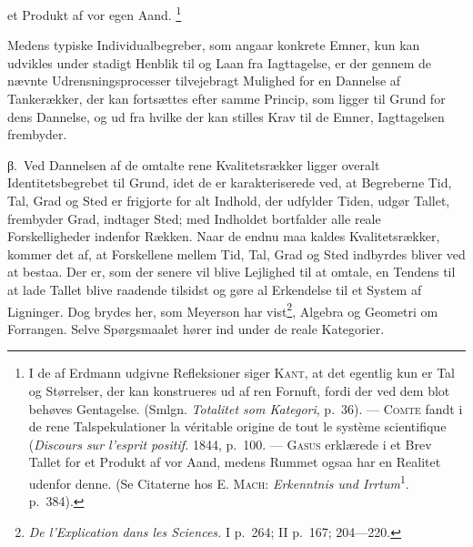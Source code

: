 \documentclass[12pt]{article}
\newcommand{\opage}[1]{\marginnote{\footnotesize\textit{[#1]}}}
\begin{document}
et Produkt af vor egen Aand.%
\footnote{I de af Erdmann udgivne \guillemotright
Refleksioner\guillemotleft{} siger \textsc{Kant}, at det egentlig kun er
Tal og Størrelser, der kan konstrueres ud af ren Fornuft, fordi der ved
dem blot behøves Gentagelse. (Smlgn. \textit{Totalitet som Kategori},
p.~36). --- \textsc{Comte} fandt i de rene Talspekulationer
\guillemotright la véritable origine de tout le système
scientifique\guillemotleft{} (\textit{Discours sur l'esprit positif.}
1844, p.~100. --- \textsc{Gasus} erklærede i et Brev Tallet for et
Produkt af vor Aand, medens Rummet ogsaa har en Realitet udenfor denne.
(Se Citaterne hos E. \textsc{Mach}: \textit{Erkenntnis und
Irrtum}\textsuperscript{1}. p.~384).}

Medens typiske Individualbegreber, som angaar konkrete Emner, kun kan
udvikles under stadigt Henblik til og Laan fra Iagttagelse, er der
gennem de nævnte Udrensningsprocesser tilvejebragt Mulighed for en
Dannelse af Tankerækker, der kan fortsættes efter samme Princip, som
\opage{40} \setcounter{footnote}{0}
ligger til Grund for dens Dannelse, og ud fra hvilke der kan stilles Krav
til de Emner, Iagttagelsen frembyder.

%
\label{sec:3b-beta}%
β.~Ved Dannelsen af de omtalte rene Kvalitetsrækker ligger overalt
Identitetsbegrebet til Grund, idet de er karakteriserede ved, at
Begreberne Tid, Tal, Grad og Sted er frigjorte for alt Indhold, der
udfylder Tiden, udgør Tallet, frembyder Grad, indtager Sted; med
Indholdet bortfalder alle reale Forskelligheder indenfor Rækken. Naar de
endnu maa kaldes Kvalitetsrækker, kommer det af, at Forskellene mellem
Tid, Tal, Grad og Sted indbyrdes bliver ved at bestaa. Der er, som der
senere vil blive Lejlighed til at omtale, en Tendens til at lade Tallet
blive raadende tilsidst og gøre al Erkendelse til et System af Ligninger.
Dog brydes her, som Meyerson har
vist\footnote{\textit{De l'Explication dans les Sciences.} I p.~264;
II p.~167; 204---220.}, Algebra og Geometri om Forrangen. Selve
Spørgsmaalet hører ind under de reale Kategorier.
\end{document}
